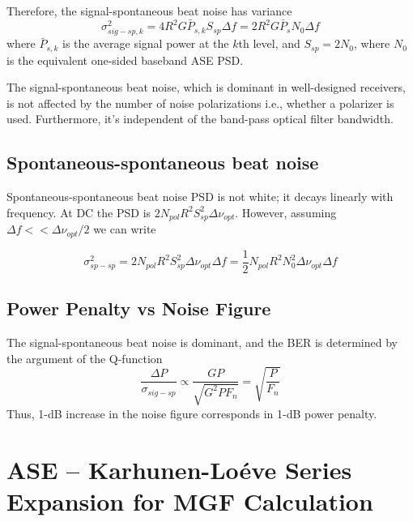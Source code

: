 \documentclass[a4paper]{article}
\begin{document}
Therefore, the signal-spontaneous beat noise has variance
\begin{equation}
\sigma^2_{sig-sp, k} = 4R^2G\bar{P}_{s,k}S_{sp}\Delta f = 2R^2G\bar{P}_sN_0\Delta f
\end{equation}
where $\bar{P}_{s,k}$ is the average signal power at the $k$th level, and $S_{sp} = 2N_0$, where $N_0$ is the equivalent one-sided baseband ASE PSD.

The signal-spontaneous beat noise, which is dominant in well-designed receivers, is not affected by the number of noise polarizations i.e., whether a polarizer is used. Furthermore, it's independent of the band-pass optical filter bandwidth.

\subsection{Spontaneous-spontaneous beat noise}

Spontaneous-spontaneous beat noise PSD is not white; it decays linearly with frequency. At DC the PSD is $2N_{pol}R^2S_{sp}^2\Delta\nu_{opt}$. However, assuming $\Delta f << \Delta\nu_{opt}/2$ we can write

\begin{equation}
\sigma^2_{sp-sp} = 2N_{pol}R^2S_{sp}^2\Delta\nu_{opt}\Delta f = \frac{1}{2}N_{pol}R^2N_0^2\Delta\nu_{opt}\Delta f 
\end{equation}

\subsection{Power Penalty vs Noise Figure}

The signal-spontaneous beat noise is dominant, and the BER is determined by the argument of the Q-function
\begin{equation}
\frac{\Delta P}{\sigma_{sig-sp}} \propto \frac{GP}{\sqrt{G^2PF_n}} = \sqrt{\frac{P}{F_n}}
\end{equation}
Thus, 1-dB increase in the noise figure corresponds in 1-dB power penalty.

\section{ASE -- Karhunen-Loéve Series Expansion for MGF Calculation} 
\end{document}
